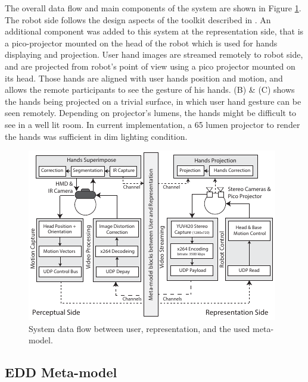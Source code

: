 The overall data flow and main components of the system are shown in Figure \ref{fig:eval-ET-system}. The robot side follows the design aspects of the toolkit described in . An additional component was added to this system at the representation side, that is a pico-projector mounted on the head of the robot which is used for hands displaying and projection. User hand images are streamed remotely to robot side, and are projected from robot's point of view using a pico projector mounted on its head. Those hands are aligned with user hands position and motion, and allows the remote participants to see the gesture of his hands.  (B) \& (C)  shows the hands being projected on a trivial surface, in which user hand gesture can be seen remotely. Depending on projector's lumens, the hands might be difficult to see in a well lit room. In current implementation, a 65 lumen projector to render the hands was sufficient in dim lighting condition. 


\begin{figure}[t!]
  \centering
  \captionsetup{justification=centering}
  \includegraphics[width=1\linewidth]{figures/eval/ET/SystemDiagram.pdf}
  \caption{System data flow between user, representation, and the used meta-model.}
  \label{fig:eval-ET-system}
\end{figure}

\subsection{EDD Meta-model}

